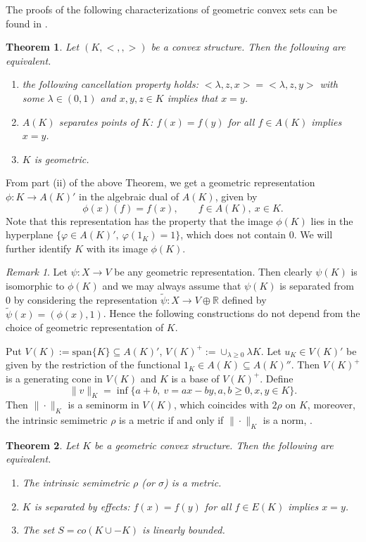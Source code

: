 \documentclass[12pt]{article}
\newtheorem{thm}{Theorem}
\newcommand{\<}{\langle}
\theoremstyle{remark}
\newtheorem{rem}{Remark}
\begin{document}
The proofs of the following characterizations of geometric convex sets can be found in \cite{stone,gudder,fritz}.

\begin{thm} Let $(K,<,,>)$ be a convex structure. Then the following are equivalent.
\begin{enumerate}
\item[(i)] the following cancellation property holds: $<\lambda,z,x>=<\lambda,z,y>$ with some $\lambda \in (0,1)$ and  $x,y,z\in K$  implies that $x=y$.
\item[(ii)] $A(K)$ separates points of $K$: $f(x)=f(y)$ for all $f\in A(K)$ implies $x=y$.
\item[(iii)] $K$ is geometric.
\end{enumerate}


\end{thm}

From part (ii) of the above Theorem, we get a geometric representation $\phi: K\to A(K)'$ in the algebraic dual of $A(K)$, given by
\[
\phi(x)(f)=f(x),\qquad f\in A(K),\ x\in K.
\]
Note that this representation has the property that the image $\phi(K)$  lies in the hyperplane $\{ \varphi\in A(K)',\ \varphi(1_K)=1\}$, which does not contain 0. 
We will further identify $K$ with its image $\phi(K)$. 

 \begin{rem} Let $\psi:X\to V$ be  any geometric representation. Then clearly $\psi(K)$ is isomorphic to $\phi(K)$ and we may always assume that $\psi(K)$ is separated from 0 by considering the representation  $\tilde \psi:X\to V\oplus \mathbb R$  defined by $\tilde \psi(x)=(\phi(x),1)$. Hence the following constructions do not depend from the choice of geometric representation of $K$.

\end{rem}

Put  $V(K):=\mathrm{span}\{K\}\subseteq A(K)'$, $V(K)^+:=\cup_{\lambda\ge 0} \lambda K$. Let $u_K\in V(K)'$ be given by the restriction of the functional $1_K\in A(K)\subseteq A(K)''$. Then $V(K)^+$ is a generating cone in $V(K)$ and $K$ is a base of $V(K)^+$. Define
\[
\|v\|_K=\inf\{a+b,\ v=ax-by, a,b\ge 0, x,y\in K\}.
\] 
Then $\|\cdot\|_K$ is a seminorm in $V(K)$, which coincides with $2\rho$ on $K$, moreover, the intrinsic semimetric $\rho$ is a metric if and only if $\|\cdot\|_K$ is a norm, \cite{gudder}.  

\begin{thm} Let $K$ be a geometric convex structure. Then the following are equivalent.
\begin{enumerate}
\item[(i)] The intrinsic semimetric  $\rho$ (or $\sigma$) is a metric.
\item[(ii)] $K$ is separated by effects: $f(x)=f(y)$ for all $f\in E(K)$ implies $x=y$.
\item[(iii)] The set $S=co(K\cup -K)$ is linearly bounded.

\end{enumerate}




\end{thm}
\end{document}

